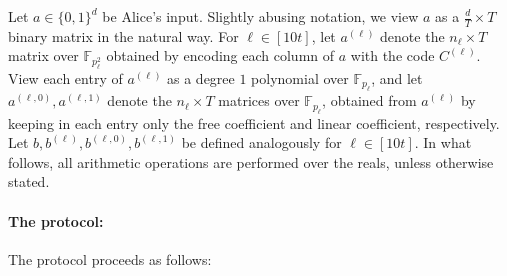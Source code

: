 \documentclass[11pt]{article}
\theoremstyle{plain}
\theoremstyle{remark}
\newcommand{\F}{\mathbb{F}}
\begin{document}
 Let $a \in\{0,1\}^{d}$ be Alice's input. Slightly abusing notation, we view $a$ as a $\frac d T \times T$ binary matrix in the natural way.
 For $\ell \in [10 t]$, let $a^{(\ell)}$ denote the  $ n_\ell \times T$ matrix over $\F_{p_\ell^2}$ obtained 
by encoding each column of 
$a$ with the code $C^{(\ell)}$. 
View each entry of $a^{(\ell)}$ as a degree $1$ polynomial over $\F_{p_\ell}$, and let $a^{(\ell,0)}, a^{(\ell,1)}$ denote the 
$n_\ell \times T$ matrices over $\F_{p_\ell}$, obtained from $a^{(\ell)}$ by keeping in each entry only the free coefficient and linear coefficient, respectively.
Let $b,b^{(\ell)}, b^{(\ell,0)}, b^{(\ell,1)}$ be defined analogously for $\ell \in [10 t]$. 
In what follows, all arithmetic operations are performed over the reals, unless otherwise stated.

 
\paragraph{The protocol:}

The protocol proceeds as follows:
\end{document}
